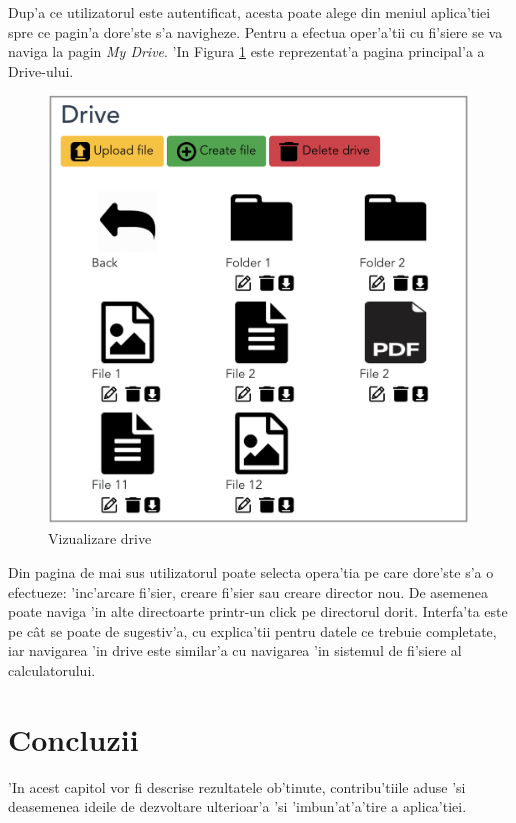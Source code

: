 \documentclass[12pt,a4paper,twoside]{report}
\begin{document}
Dup'a ce utilizatorul este autentificat, acesta poate alege din meniul aplica'tiei spre ce pagin'a dore'ste s'a navigheze. Pentru a efectua oper'a'tii cu fi'siere se va naviga la pagin \textit{My Drive}. 'In Figura \ref{bit_drive} este reprezentat'a pagina principal'a a Drive-ului.

\begin{figure}[H]
\begin{center}
\advance\leftskip-3cm
\advance\rightskip-3cm
\includegraphics[keepaspectratio=true,scale=0.5]{img/bit_drive.png}
\caption{Vizualizare drive}
\label{bit_drive}
\end{center}
\end{figure} 
Din pagina de mai sus utilizatorul poate selecta opera'tia pe care dore'ste s'a o efectueze: 'inc'arcare fi'sier, creare fi'sier sau creare director nou. De asemenea poate naviga 'in alte directoarte printr-un click pe directorul dorit. Interfa'ta este pe cât se poate de sugestiv'a, cu explica'tii pentru datele ce trebuie completate, iar navigarea 'in drive este similar'a cu navigarea 'in sistemul de fi'siere al calculatorului.

\chapter{Concluzii}
'In acest capitol vor fi descrise rezultatele ob'tinute, contribu'tiile aduse 'si deasemenea ideile de dezvoltare ulterioar'a 'si 'imbun'at'a'tire a aplica'tiei.
\end{document}
